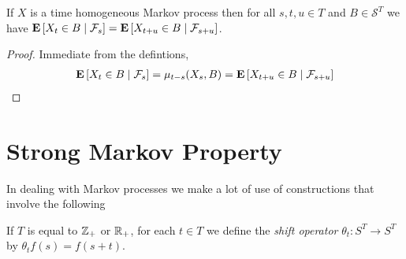 \begin{prop}If $X$ is a time homogeneous Markov process then
for all $s,t,u \in T$ and $B
  \in \mathcal{S}^T$ we have
  $\cexpectationlong{\mathcal{F}_s}{X_t \in B} = \cexpectationlong{\mathcal{F}_{s+u}}{X_{t+u} \in B}$.
\end{prop}
\begin{proof}
Immediate from the defintions,
\begin{align*}
\cexpectationlong{\mathcal{F}_s}{X_t \in B} = \mu_{t-s}(X_s, B) = \cexpectationlong{\mathcal{F}_{s+u}}{X_{t+u} \in B}
\end{align*}
\end{proof}

\section{Strong Markov Property}

In dealing with Markov processes we make a lot of use of constructions
that involve the following
\begin{defn}If $T$ is equal to $\integers_+$ or $\reals_+$, for each
  $t \in T$ we define
  the \emph{shift operator}  $\theta_t : S^T \to S^T$ by $\theta_t f
  (s) = f(s +t)$.
\end{defn}


